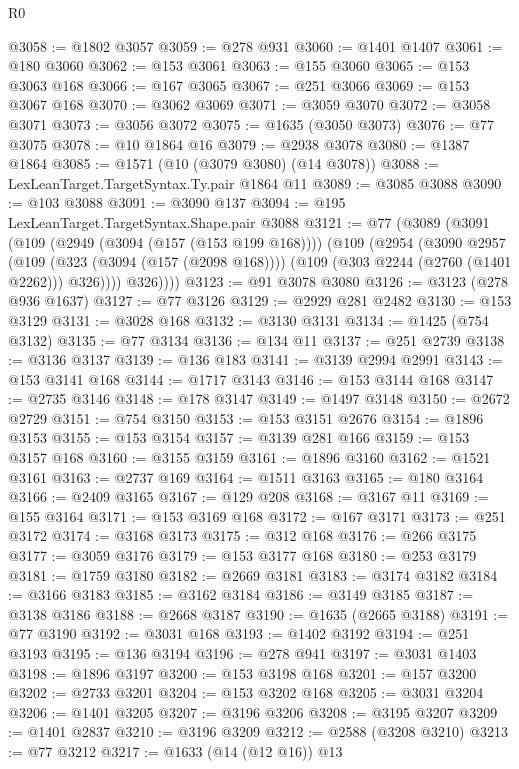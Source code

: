 \begin{lexlean}{R0}
\begin{coremodule}
@3058 := @1802 @3057
@3059 := @278 @931
@3060 := @1401 @1407
@3061 := @180 @3060
@3062 := @153 @3061
@3063 := @155 @3060
@3065 := @153 @3063 @168
@3066 := @167 @3065
@3067 := @251 @3066
@3069 := @153 @3067 @168
@3070 := @3062 @3069
@3071 := @3059 @3070
@3072 := @3058 @3071
@3073 := @3056 @3072
@3075 := @1635 (@3050 @3073)
@3076 := @77 @3075
@3078 := @10 @1864 @16
@3079 := @2938 @3078
@3080 := @1387 @1864
@3085 := @1571 (@10 (@3079 @3080) (@14 @3078))
@3088 := LexLeanTarget.TargetSyntax.Ty.pair @1864 @11
@3089 := @3085 @3088
@3090 := @103 @3088
@3091 := @3090 @137
@3094 := @195 LexLeanTarget.TargetSyntax.Shape.pair @3088
@3121 := @77
    (@3089
      (@3091
        (@109
          (@2949 (@3094 (@157 (@153 @199 @168))))
          (@109
            (@2954
              (@3090
                @2957
                (@109
                  (@323 (@3094 (@157 (@2098 @168))))
                  (@109 (@303 @2244 (@2760 (@1401 @2262))) @326))))
            @326))))
@3123 := @91 @3078 @3080
@3126 := @3123 (@278 @936 @1637)
@3127 := @77 @3126
@3129 := @2929 @281 @2482
@3130 := @153 @3129
@3131 := @3028 @168
@3132 := @3130 @3131
@3134 := @1425 (@754 @3132)
@3135 := @77 @3134
@3136 := @134 @11
@3137 := @251 @2739
@3138 := @3136 @3137
@3139 := @136 @183
@3141 := @3139 @2994 @2991
@3143 := @153 @3141 @168
@3144 := @1717 @3143
@3146 := @153 @3144 @168
@3147 := @2735 @3146
@3148 := @178 @3147
@3149 := @1497 @3148
@3150 := @2672 @2729
@3151 := @754 @3150
@3153 := @153 @3151 @2676
@3154 := @1896 @3153
@3155 := @153 @3154
@3157 := @3139 @281 @166
@3159 := @153 @3157 @168
@3160 := @3155 @3159
@3161 := @1896 @3160
@3162 := @1521 @3161
@3163 := @2737 @169
@3164 := @1511 @3163
@3165 := @180 @3164
@3166 := @2409 @3165
@3167 := @129 @208
@3168 := @3167 @11
@3169 := @155 @3164
@3171 := @153 @3169 @168
@3172 := @167 @3171
@3173 := @251 @3172
@3174 := @3168 @3173
@3175 := @312 @168
@3176 := @266 @3175
@3177 := @3059 @3176
@3179 := @153 @3177 @168
@3180 := @253 @3179
@3181 := @1759 @3180
@3182 := @2669 @3181
@3183 := @3174 @3182
@3184 := @3166 @3183
@3185 := @3162 @3184
@3186 := @3149 @3185
@3187 := @3138 @3186
@3188 := @2668 @3187
@3190 := @1635 (@2665 @3188)
@3191 := @77 @3190
@3192 := @3031 @168
@3193 := @1402 @3192
@3194 := @251 @3193
@3195 := @136 @3194
@3196 := @278 @941
@3197 := @3031 @1403
@3198 := @1896 @3197
@3200 := @153 @3198 @168
@3201 := @157 @3200
@3202 := @2733 @3201
@3204 := @153 @3202 @168
@3205 := @3031 @3204
@3206 := @1401 @3205
@3207 := @3196 @3206
@3208 := @3195 @3207
@3209 := @1401 @2837
@3210 := @3196 @3209
@3212 := @2588 (@3208 @3210)
@3213 := @77 @3212
@3217 := @1633 (@14 (@12 @16)) @13

\end{coremodule}
\end{lexlean}
